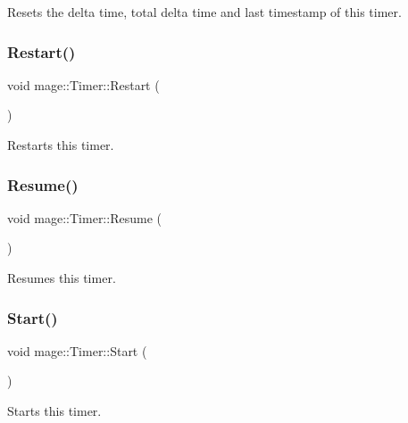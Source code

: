 Resets the delta time, total delta time and last timestamp of this timer. \hypertarget{classmage_1_1_timer_a47e6893e733911624ebf54d5f88cd3fd}{}\label{classmage_1_1_timer_a47e6893e733911624ebf54d5f88cd3fd} 
\subsubsection{\texorpdfstring{Restart()}{Restart()}}
{\footnotesize\ttfamily void mage\+::\+Timer\+::\+Restart (\begin{DoxyParamCaption}{ }\end{DoxyParamCaption})\hspace{0.3cm}{\ttfamily [noexcept]}}

Restarts this timer. \hypertarget{classmage_1_1_timer_ab3cfad4fd61d52852181f7a060069892}{}\label{classmage_1_1_timer_ab3cfad4fd61d52852181f7a060069892} 
\subsubsection{\texorpdfstring{Resume()}{Resume()}}
{\footnotesize\ttfamily void mage\+::\+Timer\+::\+Resume (\begin{DoxyParamCaption}{ }\end{DoxyParamCaption})\hspace{0.3cm}{\ttfamily [noexcept]}}

Resumes this timer. \hypertarget{classmage_1_1_timer_a60e9e329f1e71a6e25351ff6dbcc1b92}{}\label{classmage_1_1_timer_a60e9e329f1e71a6e25351ff6dbcc1b92} 
\subsubsection{\texorpdfstring{Start()}{Start()}}
{\footnotesize\ttfamily void mage\+::\+Timer\+::\+Start (\begin{DoxyParamCaption}{ }\end{DoxyParamCaption})\hspace{0.3cm}{\ttfamily [noexcept]}}

Starts this timer. \hypertarget{classmage_1_1_timer_aa880e02bfeea2d082a5f34e497bd6500}{}\label{classmage_1_1_timer_aa880e02bfeea2d082a5f34e497bd6500} 
